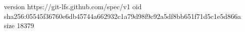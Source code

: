 version https://git-lfs.github.com/spec/v1
oid sha256:05545f36760e6db45744a662932c1a79d98f9c92a5df8bb651f71d5c1e5d866a
size 18379
